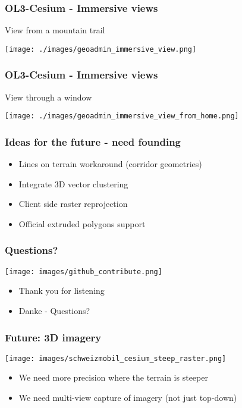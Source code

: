 \documentclass[handout]{beamer}
\begin{document}
  \begin{frame}
    \frametitle{OL3-Cesium - Immersive views}
    View from a mountain trail
    \begin{center}
      \texttt{[image: ./images/geoadmin\_immersive\_view.png]}
    \end{center}
  \end{frame}


  \begin{frame}
    \frametitle{OL3-Cesium - Immersive views}
    View through a window
    \begin{center}
      \texttt{[image: ./images/geoadmin\_immersive\_view\_from\_home.png]}
    \end{center}
  \end{frame}


  \begin{frame}
    \frametitle{Ideas for the future - need founding}
    \begin{itemize}
      \pause\item Lines on terrain workaround (corridor geometries)
      \pause\item Integrate 3D vector clustering
      \pause\item Client side raster reprojection
      \pause\item Official extruded polygons support
    \end{itemize}
  \end{frame}


  \begin{frame}
    \frametitle{Questions?}
    \vspace{-20pt}\begin{center}
      \texttt{[image: images/github\_contribute.png]}
    \end{center}
    \begin{itemize}
      \item Thank you for listening
      \item Danke - Questions?
    \end{itemize}
  \end{frame}


  \begin{frame}
    \frametitle{Future: 3D imagery}
    \begin{center}
      \texttt{[image: images/schweizmobil\_cesium\_steep\_raster.png]}
    \end{center}
    \begin{itemize}
      \pause\item We need more precision where the terrain is steeper
      \pause\item We need multi-view capture of imagery (not just top-down)
    \end{itemize}
  \end{frame}
\end{document}

